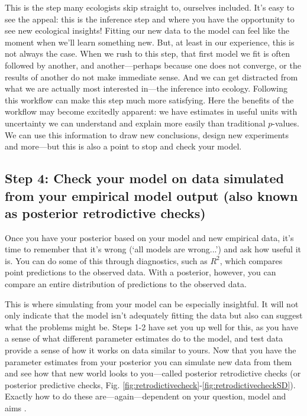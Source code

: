 \documentclass[11pt]{article}
\begin{document}
This is the step many ecologists skip straight to, ourselves included. It's easy to see the appeal: this is the inference step and where you have the opportunity to see new ecological insights! Fitting our new data to the model can feel like the moment when we'll learn something new. But, at least in our experience, this is not always the case. When we rush to this step, that first model we fit is often followed by another, and another---perhaps because one does not converge, or the results of another do not make immediate sense. And we can get distracted from what we are actually most interested in---the inference into ecology. %
Following this workflow can make this step much more satisfying. Here the benefits of the workflow may become excitedly apparent: we have estimates in useful units with uncertainty we can understand and explain more easily than traditional $p$-values. We can use this information to draw new conclusions, design new experiments and more---but this is also a point to stop and check your model. 

\subsection*{Step 4: Check your model on data simulated from your empirical model output (also known as posterior retrodictive checks)} 

Once you have your posterior based on your model and new empirical data, it's time to remember that it's wrong (`all models are wrong...') and ask how useful it is. You can do some of this through diagnostics, such as $R^2$, which compares point predictions to the observed data. With a posterior, however, you can compare an entire distribution of predictions to the observed data. 

This is where simulating from your model can be especially insightful. It will not only indicate that the model isn't adequately fitting the data but also can suggest what the problems might be. Steps 1-2 have set you up well for this, as you have a sense of what different parameter estimates do to the model, and test data provide a sense of how it works on data similar to yours. Now that you have the parameter estimates from your posterior you can simulate new data from them and see how that new world looks to you---called posterior retrodictive checks (or posterior predictive checks, Fig. \ref{fig:retrodictivecheck}-\ref{fig:retrodictivecheckSD}). Exactly how to do these are---again---dependent on your question, model and aims \citep[but there is lots written on this,][]{held2010,gelman200ppc,conn2018}. 
\end{document}
